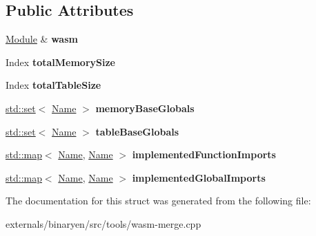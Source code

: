 \subsection*{Public Attributes}
\begin{DoxyCompactItemize}
\item 
\mbox{\label{struct_mergeable_a0e293a0156d470fe490801e710b693ca}} 
\mbox{\hyperlink{classwasm_1_1_module}{Module}} \& {\bfseries wasm}
\item 
\mbox{\label{struct_mergeable_a6a8c40422d102295c980e5fb1a1a0bd5}} 
Index {\bfseries total\+Memory\+Size}
\item 
\mbox{\label{struct_mergeable_a9d8ff186914595503864eeb3eb2b3479}} 
Index {\bfseries total\+Table\+Size}
\item 
\mbox{\label{struct_mergeable_a398fa2032641cdbdbc9395f1e939d0fc}} 
\mbox{\hyperlink{classstd_1_1set}{std\+::set}}$<$ \mbox{\hyperlink{structwasm_1_1_name}{Name}} $>$ {\bfseries memory\+Base\+Globals}
\item 
\mbox{\label{struct_mergeable_aef20fdaa9da71bbca9deca4417c2aac9}} 
\mbox{\hyperlink{classstd_1_1set}{std\+::set}}$<$ \mbox{\hyperlink{structwasm_1_1_name}{Name}} $>$ {\bfseries table\+Base\+Globals}
\item 
\mbox{\label{struct_mergeable_a0508d1bb057610fa839543bf208bfe95}} 
\mbox{\hyperlink{classstd_1_1map}{std\+::map}}$<$ \mbox{\hyperlink{structwasm_1_1_name}{Name}}, \mbox{\hyperlink{structwasm_1_1_name}{Name}} $>$ {\bfseries implemented\+Function\+Imports}
\item 
\mbox{\label{struct_mergeable_a1b5f4c830c25725724879c353f423733}} 
\mbox{\hyperlink{classstd_1_1map}{std\+::map}}$<$ \mbox{\hyperlink{structwasm_1_1_name}{Name}}, \mbox{\hyperlink{structwasm_1_1_name}{Name}} $>$ {\bfseries implemented\+Global\+Imports}
\end{DoxyCompactItemize}


The documentation for this struct was generated from the following file\+:\begin{DoxyCompactItemize}
\item 
externals/binaryen/src/tools/wasm-\/merge.\+cpp\end{DoxyCompactItemize}
